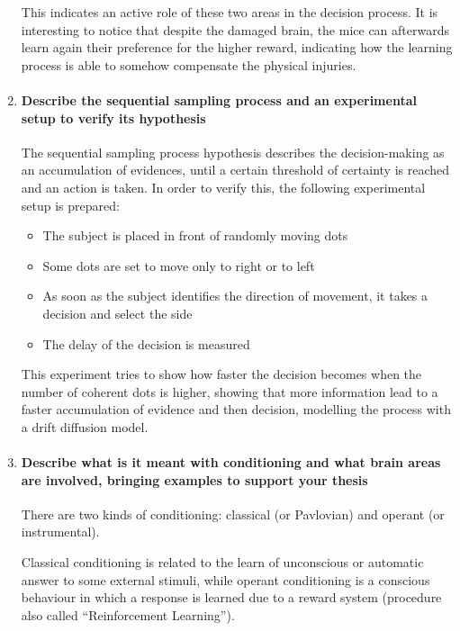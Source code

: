 \documentclass[12pt,article,oneside,a4paper]{memoir}
\begin{document}
\begin{enumerate}
This indicates an active role of these two areas in the decision process. It is
interesting to notice that despite the damaged brain, the mice can afterwards
learn again their preference for the higher reward, indicating how the learning
process is able to somehow compensate the physical injuries.

\item \paragraph{Describe the sequential sampling process and an experimental
setup to verify its hypothesis}

The sequential sampling process hypothesis describes the decision-making as an
accumulation of evidences, until a certain threshold of certainty is reached
and an action is taken. In order to verify this, the following experimental
setup is prepared:

\begin{itemize}
\item The subject is placed in front of randomly moving dots
\item Some dots are set to move only to right or to left
\item As soon as the subject identifies the direction of movement, it takes a
decision and select the side
\item The delay of the decision is measured
\end{itemize}

This experiment tries to show how faster the decision becomes when the number
of coherent dots is higher, showing that more information lead to a faster
accumulation of evidence and then decision, modelling the process with a drift
diffusion model.

\item \paragraph{Describe what is it meant with conditioning and what brain
areas are involved, bringing examples to support your thesis}

There are two kinds of conditioning: classical (or Pavlovian) and operant (or
instrumental).

Classical conditioning is related to the learn of unconscious or automatic
answer to some external stimuli, while operant conditioning is a conscious
behaviour in which a response is learned due to a reward system (procedure also
called “Reinforcement Learning”).


\end{enumerate}
\end{document}
